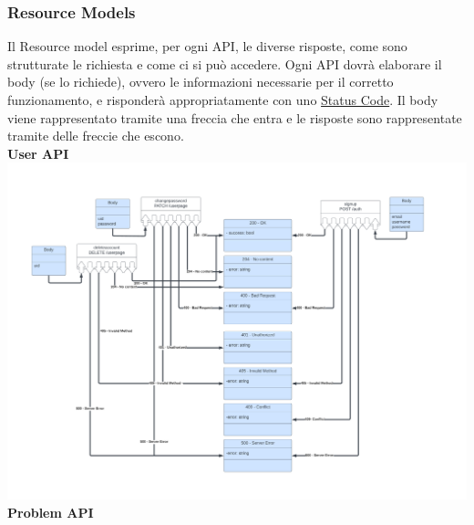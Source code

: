 \documentclass[11pt, a4paper]{article}
\theoremstyle{definition}
\begin{document}
\subsubsection{Resource Models}
Il Resource model esprime, per ogni API, le diverse risposte, come sono strutturate le richiesta e come ci si può accedere.
Ogni API dovrà elaborare il body (se lo richiede), ovvero le informazioni necessarie per il corretto funzionamento, e risponderà appropriatamente con uno \href{https://developer.mozilla.org/en-US/docs/Web/HTTP/Status}{Status Code}.
Il body viene rappresentato tramite una freccia che entra e le risposte sono rappresentate tramite delle freccie che escono.\\
\newpage
\textbullet \textbf{ User API}\\
\includegraphics[width=\textwidth]{materiale/Resource Models Users.png}
\newpage
\textbullet \textbf{ Problem API}\\
\end{document}
